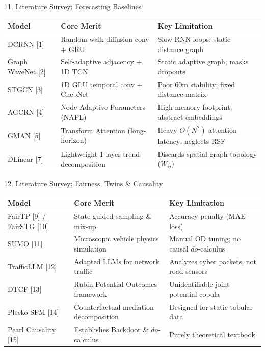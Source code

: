 \documentclass[aspectratio=169, 10pt]{beamer}
\begin{document}
\begin{frame}{11. Literature Survey: Forecasting Baselines}
  \begin{table}
    \small
    \begin{tabular}{lp{4.5cm}p{4.5cm}}
      \toprule
      \textbf{Model} & \textbf{Core Merit} & \textbf{Key Limitation} \\
      \midrule
      DCRNN [1] & Random-walk diffusion conv + GRU & Slow RNN loops; static distance graph \\
      Graph WaveNet [2] & Self-adaptive adjacency + 1D TCN & Static adaptive graph; masks dropouts \\
      STGCN [3] & 1D GLU temporal conv + ChebNet & Poor 60m stability; fixed distance matrix \\
      AGCRN [4] & Node Adaptive Parameters (NAPL) & High memory footprint; abstract embeddings \\
      GMAN [5] & Transform Attention (long-horizon) & Heavy $O(N^2)$ attention latency; neglects RSF \\
      DLinear [7] & Lightweight 1-layer trend decomposition & Discards spatial graph topology ($W_{ij}$) \\
      \bottomrule
    \end{tabular}
  \end{table}
\end{frame}

\begin{frame}{12. Literature Survey: Fairness, Twins \& Causality}
  \begin{table}
    \small
    \begin{tabular}{lp{4.5cm}p{4.5cm}}
      \toprule
      \textbf{Model} & \textbf{Core Merit} & \textbf{Key Limitation} \\
      \midrule
      FairTP [9] / FairSTG [10] & State-guided sampling \& mix-up & Accuracy penalty (MAE loss) \\
      SUMO [11] & Microscopic vehicle physics simulation & Manual OD tuning; no causal $do$-calculus \\
      TrafficLLM [12] & Adapted LLMs for network traffic & Analyzes cyber packets, not road sensors \\
      DTCF [13] & Rubin Potential Outcomes framework & Unidentifiable joint potential copula \\
      Plecko SFM [14] & Counterfactual mediation decomposition & Designed for static tabular data \\
      Pearl Causality [15] & Establishes Backdoor \& $do$-calculus & Purely theoretical textbook \\
      \bottomrule
    \end{tabular}
  \end{table}
\end{frame}
\end{document}
